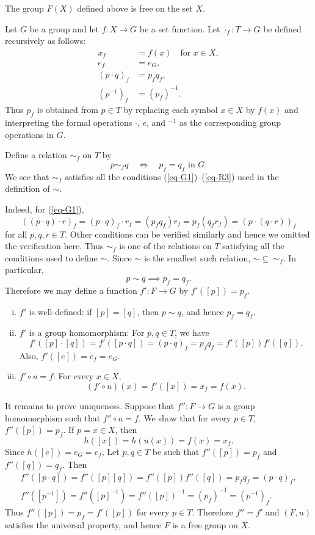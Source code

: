\begin{proposition}
	The group $F(X)$ defined above is free on the set $X$.
\end{proposition}
\begin{sketch}
	Let $G$ be a group and let $f:X\rightarrow G$ be a set function.  Let $\cdot_f:T\to G$ be defined recursively as follows:  
	\begin{align*}
		x_f &= f(x) \quad \text{for }x\in X,\\
		e_f &= e_G,\\
		(p\cdot q)_f &= p_fq_f,\\
		(p^{-1})_f &= (p_f)^{-1}.
	\end{align*}
	Thus $p_f$ is obtained from $p\in T$ by replacing each
	symbol $x\in X$ by $f(x)$ and interpreting the formal operations
	$\cdot$, $e$, and ${}^{-1}$ as the corresponding group operations in $G$.
	
	Define a relation $\sim_f$ on $T$ by
	$$ p\sim_f q
	\quad\iff\quad
	p_f=q_f \text{ in }G.$$
	We see that $\sim_f$ satisfies all the conditions (\ref{eq-G1})--(\ref{eq-R3}) used in the definition of $\sim$.
	
	Indeed, for (\ref{eq-G1}), 
	$$((p\cdot q)\cdot r)_f = (p\cdot q)_f \cdot r_f = (p_fq_f)r_f = p_f(q_fr_f) = (p\cdot(q\cdot r))_f$$
	for all $p,q,r\in T$. Other conditions can be verified similarly and hence we omitted the verification here. Thus $\sim_f$ is one of the relations on $T$ satisfying all the conditions used to define $\sim$. Since $\sim$ is the
	smallest such relation, $\sim \subseteq\ \sim_f$.  In particular, 
	$$p\sim q\implies p_f=q_f.$$ 
	Therefore we may define a function $f':F\rightarrow G$ by $f'([p])=p_f$. 
	\begin{enumerate}[(i)]
		\item $f'$ is well-defined: if $[p]=[q]$, then $p\sim q$, and hence $p_f=q_f$.
		\item $f'$ is a group homomorphism: For $p,q\in T$, we have
		\begin{equation*}
			f'([p]\cdot[q]) =  f'([p\cdot q]) = (p\cdot q)_f = p_fq_f = f'([p])f'([q]).
		\end{equation*} 
		Also, $f'([e])=e_f=e_G$.
		\item $f'\circ u=f$: For every $x\in X$,
		\begin{equation*}
			(f'\circ u)(x) = f'([x]) = x_f = f(x).
		\end{equation*}
	\end{enumerate}
	It remains to prove uniqueness. Suppose that $f'':F\rightarrow G$  is a group homomorphism such that $f''\circ u=f$. We show that for every $p\in T$, $f''([p])=p_f$. If $p=x\in X$, then
	$$h([x])=h(u(x))=f(x)=x_f.$$
	Since $h([e])=e_G=e_f$,  Let $p,q\in T$ be such that $f''([p])=p_f$ and $f''([q])=q_f$. Then
	\begin{gather*}
		f''([p\cdot q]) = f''([p][q]) = f''([p])f''([q]) = p_fq_f = (p\cdot q)_f,
		\\
		f''([p^{-1}]) = f''([p]^{-1}) = f''([p])^{-1} = (p_f)^{-1} = (p^{-1})_f.
	\end{gather*}
	Thus $f''([p]) = p_f = f'([p])$ for every $p\in T$. Therefore $f''=f'$ and $(F,u)$ satisfies the universal property, and hence $F$ is a free group on $X$.
\end{sketch}

